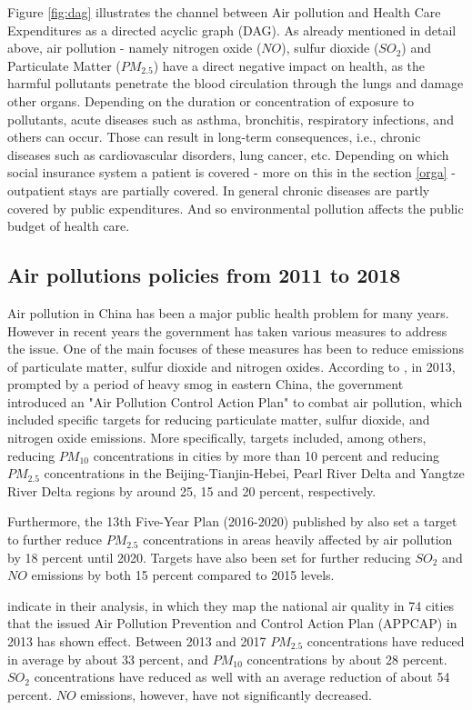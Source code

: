 \documentclass[
]{article}
\begin{document}
Figure \ref{fig:dag} illustrates the channel between Air pollution and Health Care Expenditures as a directed acyclic graph (DAG). As already mentioned in detail above, air pollution - namely nitrogen oxide ($NO$), sulfur dioxide ($SO_2$) and Particulate Matter ($PM_{2.5}$) have a direct negative impact on health, as the harmful pollutants penetrate the blood circulation through the lungs and damage other organs. Depending on the duration or concentration of exposure to pollutants, acute diseases such as asthma, bronchitis, respiratory infections, and others can occur. Those can result in long-term consequences, i.e., chronic diseases such as cardiovascular disorders, lung cancer, etc.  
Depending on which social insurance system a patient is covered - more on this in the section \ref{orga} - outpatient stays are partially covered. In general chronic diseases are partly covered by public expenditures. And so environmental pollution affects the public budget of health care. 
	
	
	\subsection{Air pollutions policies from 2011 to 2018}
	
	Air pollution in China has been a major public health problem for many years. However in recent years the government has taken various measures to address the issue. One of the main focuses of these measures has been to reduce emissions of particulate matter, sulfur dioxide and nitrogen oxides. 
	According to \cite{CHINA2013}, in 2013, prompted by a period of heavy smog in eastern China, the government introduced an "Air Pollution Control Action Plan" to combat air pollution, which included specific targets for reducing particulate matter, sulfur dioxide, and nitrogen oxide emissions. More specifically, targets included, among others, reducing $PM_10$ concentrations in cities by more than 10 percent and reducing $PM_2.5$ concentrations in the Beijing-Tianjin-Hebei, Pearl River Delta and Yangtze River Delta regions by  around 25, 15 and 20 percent, respectively. 
	
	Furthermore, the 13th Five-Year Plan (2016-2020) published by \cite{CHINA2016} also set a target to further reduce $PM_2.5$ concentrations in areas heavily affected by air pollution by 18 percent until 2020. Targets have also been set for further reducing $SO_2$ and $NO$ emissions by both 15 percent compared to 2015 levels. 
	
	\cite{HUANG2018e313} indicate in their analysis, in which they map the national air quality in 74 cities that the issued Air Pollution Prevention and Control Action Plan (APPCAP) in 2013 has shown effect. Between 2013 and 2017 $PM_2.5$ concentrations have reduced in average by about 33 percent, and $PM_10$ concentrations by about 28 percent. $SO_2$ concentrations have reduced as well with an average reduction of about 54 percent. $NO$ emissions, however, have not significantly decreased. 
	
\end{document}
